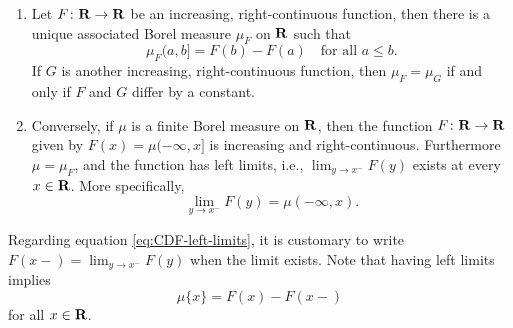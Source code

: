 \begin{thm} \label{thm:increasing-rcont-Borel-measure-connection} \leavevmode
    \begin{enumerate}
        \item \label{enu:CDF-measure} Let $F\colon \mathbf{R} \to \mathbf{R}$ be an increasing, right-continuous function, then there is a unique associated Borel measure $\mu_F$ on $\mathbf{R}$ such that \[
            \mu_F(a,b] = F(b) - F(a)\quad \text{for all }a\leq b.
        \]
    If $G$ is another increasing, right-continuous function, then $\mu_F = \mu_G$ if and only if $F$ and $G$ differ by a constant.
        \item \label{enu:measure-CDF} Conversely, if $\mu$ is a finite Borel measure on $\mathbf{R}$, then the function $F\colon \mathbf{R} \to \mathbf{R}$ given by $F(x) = \mu(-\infty,x]$ is increasing and right-continuous. Furthermore $\mu = \mu_F$, and the function has left limits, i.e., $\lim_{y \to x^-} F(y)$ exists at every $x \in \mathbf{R}$. More specifically, \begin{equation} \label{eq:CDF-left-limits}
             \lim_{y \to x^-} F(y) = \mu(-\infty,x).
        \end{equation}
    \end{enumerate}
\end{thm}

Regarding equation \eqref{eq:CDF-left-limits}, it is customary to write $F(x-) = \lim_{y \to x^-} F(y)$ when the limit exists. Note that having left limits implies \[\mu\{x\} = F(x) - F(x-)\] for all $x \in \mathbf{R}$.

